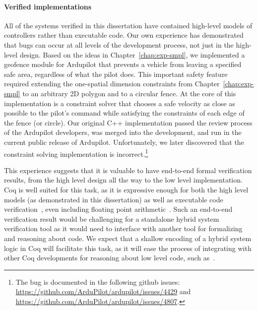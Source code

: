 \paragraph{Verified implementations}
All of the systems verified in this dissertation have contained high-level
models of controllers rather than executable code. Our own experience has
demonstrated that bugs can occur at all levels of the development process,
not just in the high-level design. Based on the ideas in
Chapter~\ref{chap:exp-smpl}, we implemented a geofence module for Ardupilot
that prevents a vehicle from leaving a specified safe area, regardless of
what the pilot does. This important safety feature required extending the
one-spatial dimension constraints from Chapter~\ref{chap:exp-smpl} to an
arbitrary 2D polygon and to a circular fence. At the core of this
implementation is a constraint solver that chooses a safe velocity as close
as possible to the pilot's command while satisfying the constraints of each
edge of the fence (or circle). Our original C++ implementation passed the
review process of the Ardupilot developers, was merged into the
development, and run in the current public release of
Ardupilot. Unfortunately, we later discovered that the constraint solving
implementation is incorrect.\footnote{The bug is documented in the
  following github issues:
  \url{https://github.com/ArduPilot/ardupilot/issues/4429} and
  \url{https://github.com/ArduPilot/ardupilot/issues/4807}.}

This experience suggests that it is valuable to have end-to-end formal
verification results, from the high level design all the way to the low
level implementation. Coq is well suited for this task, as it is expressive
enough for both the high level models (as demonstrated in this
dissertation) as well as executable code
verification~\cite{leroy2009compcert,appel2014vst}, even including floating
point arithmetic~\cite{flocq11}. Such an end-to-end verification result
would be challenging for a standalone hybrid system verification tool as it
would need to interface with another tool for formalizing and reasoning
about code. We expect that a shallow encoding of a hybrid system logic in
Coq will facilitate this task, as it will ease the process of integrating
with other Coq developments for reasoning about low level code, such
as~\cite{appel2014vst,flocq11}.

